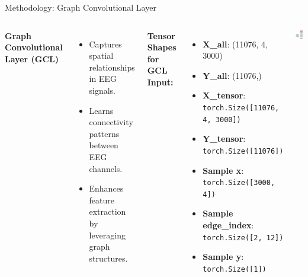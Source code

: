 \begin{frame}{Methodology: Graph Convolutional Layer}
    \begin{columns}[c] %

        
        \textbf{Graph Convolutional Layer (GCL)}
        \vspace{5pt}
        \begin{itemize}
            \item Captures spatial relationships in EEG signals.
            \item Learns connectivity patterns between EEG channels.
            \item Enhances feature extraction by leveraging graph structures.
        \end{itemize}

        \vspace{8pt} %
        \textbf{Tensor Shapes for GCL Input:}
        \vspace{3pt}
        \begin{itemize}
            \item \textbf{X\_all}: (11076, 4, 3000)
            \item \textbf{Y\_all}: (11076,)
            \item \textbf{X\_tensor}: \texttt{torch.Size([11076, 4, 3000])}
            \item \textbf{Y\_tensor}: \texttt{torch.Size([11076])}
            \item \textbf{Sample x}: \texttt{torch.Size([3000, 4])}
            \item \textbf{Sample edge\_index}: \texttt{torch.Size([2, 12])}
            \item \textbf{Sample y}: \texttt{torch.Size([1])}
        \end{itemize}

        \centering
        \vspace{-10pt} %
        \includegraphics[width=0.6\linewidth]{images/paper_3/Graph Convolution Neural Network.png} %


\end{columns}
\end{frame}
